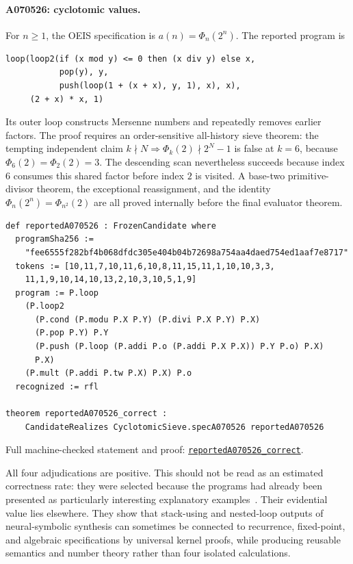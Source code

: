 \documentclass[11pt]{article}
\newcommand{\formalcommit}{f3a31db36bb2f944312ee31c1d86c2758109e83a}
\newcommand{\formalblob}{https://github.com/zariuq/MeTTapedia/blob/\formalcommit/lean/mettapedia/Mettapedia}
\newcommand{\leansource}[3]{%
  \href{\formalblob/#1\#L#2}{\nolinkurl{#3}}}
\begin{document}
\paragraph{A070526: cyclotomic values.}
For $n\geq 1$, the OEIS specification is
$a(n)=\Phi_n(2^n)$. The reported program is
\begin{lstlisting}
loop(loop2(if (x mod y) <= 0 then (x div y) else x,
           pop(y), y,
           push(loop(1 + (x + x), y, 1), x), x),
     (2 + x) * x, 1)
\end{lstlisting}
Its outer loop constructs Mersenne numbers and repeatedly removes earlier factors. The
proof requires an order-sensitive all-history sieve theorem: the tempting independent
claim $k\nmid N\Rightarrow\Phi_k(2)\nmid 2^N-1$ is false at $k=6$, because
$\Phi_6(2)=\Phi_2(2)=3$. The descending scan nevertheless succeeds because index $6$
consumes this shared factor before index $2$ is visited. A base-two primitive-divisor
theorem, the exceptional reassignment, and the identity
$\Phi_n(2^n)=\Phi_{n^2}(2)$ are all proved internally before the final evaluator theorem.
\begin{lstlisting}[caption={The reported A070526 artifact and its universal Lean theorem.}]
def reportedA070526 : FrozenCandidate where
  programSha256 :=
    "fee6555f282bf4b068dfdc305e404b04b72698a754aa4daed754ed1aaf7e8717"
  tokens := [10,11,7,10,11,6,10,8,11,15,11,1,10,10,3,3,
    11,1,9,10,14,10,13,2,10,3,10,5,1,9]
  program := P.loop
    (P.loop2
      (P.cond (P.modu P.X P.Y) (P.divi P.X P.Y) P.X)
      (P.pop P.Y) P.Y
      (P.push (P.loop (P.addi P.o (P.addi P.X P.X)) P.Y P.o) P.X)
      P.X)
    (P.mult (P.addi P.tw P.X) P.X) P.o
  recognized := rfl

theorem reportedA070526_correct :
    CandidateRealizes CyclotomicSieve.specA070526 reportedA070526
\end{lstlisting}
\noindent Full machine-checked statement and proof:
\leansource{GSLT/LanguageDef/Gauthier/ReportedSequencePrograms.lean}{938-L974}{reportedA070526_correct}.

All four adjudications are positive. This should not be read as an estimated correctness
rate: they were selected because the programs had already been presented as particularly
interesting explanatory examples~\cite{urban2026slides}. Their evidential value lies
elsewhere. They show that stack-using and nested-loop outputs of neural-symbolic synthesis
can sometimes be connected to recurrence, fixed-point, and algebraic specifications by
universal kernel proofs, while producing reusable semantics and number theory rather than
four isolated calculations.
\end{document}
